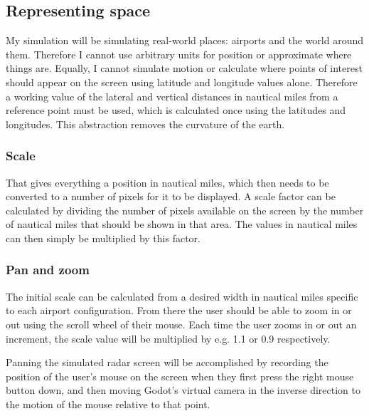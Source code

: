 \documentclass{article}
\begin{document}
\subsection{Representing space}
My simulation will be simulating real-world places: airports and the world around them.
Therefore I cannot use arbitrary units for position or approximate where things are.
Equally, I cannot simulate motion or calculate where points of interest should appear on the screen using latitude and longitude values alone.
Therefore a working value of the lateral and vertical distances in nautical miles from a reference point must be used, which is calculated once using the latitudes and longitudes.
This abstraction removes the curvature of the earth.

\subsubsection{Scale}
That gives everything a position in nautical miles, which then needs to be converted to a number of pixels for it to be displayed.
A scale factor can be calculated by dividing the number of pixels available on the screen by the number of nautical miles that should be shown in that area.
The values in nautical miles can then simply be multiplied by this factor.

\subsubsection{Pan and zoom}
The initial scale can be calculated from a desired width in nautical miles specific to each airport configuration.
From there the user should be able to zoom in or out using the scroll wheel of their mouse.
Each time the user zooms in or out an increment, the scale value will be multiplied by e.g. 1.1 or 0.9 respectively.

Panning the simulated radar screen will be accomplished by recording the position of the user's mouse on the screen when they first press the right mouse button down, and then moving Godot's virtual camera in the inverse direction to the motion of the mouse relative to that point.
\end{document}
